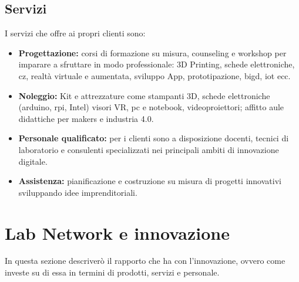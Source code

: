 \subsection{Servizi}
I servizi che \lab{} offre ai propri clienti sono:
\begin{itemize}
\item \textbf{Progettazione:} corsi di formazione su misura, \gls{counseling} e \gls{workshop} per imparare a sfruttare in modo professionale: 3D Printing, schede elettroniche, \gls{cz}, realtà virtuale e aumentata, sviluppo App, prototipazione, \gls{bigd}, \gls{iot} ecc.
\item \textbf{Noleggio:} Kit e attrezzature come stampanti 3D, schede elettroniche (\gls{arduino}, \gls{rpi}, Intel) visori VR, pc e notebook, videoproiettori; affitto aule didattiche per \gls{makers} e industria 4.0.
\item \textbf{Personale qualificato:} per i clienti sono a disposizione docenti, tecnici di laboratorio e consulenti specializzati nei principali ambiti di innovazione digitale.
\item \textbf{Assistenza:} pianificazione e costruzione su misura di progetti innovativi sviluppando idee imprenditoriali.
\end{itemize}

\section{Lab Network e innovazione}
In questa sezione descriverò il rapporto che \lab{} ha con l'innovazione, ovvero come investe su di essa in termini di prodotti, servizi e personale.